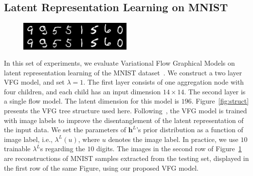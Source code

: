 \documentclass{article}
\begin{document}
\subsection{Latent Representation Learning on MNIST}\label{sec:exp:mnist}
\begin{figure}
\vspace{-0.2in}
    \centering
       \includegraphics[width=0.5\textwidth]{fig/reconst_Y.png}
    \label{fig:reconst}
\vspace{-0.12in}
\end{figure}
In this set of experiments, we evaluate  Variational Flow Graphical Models on latent representation learning of the MNIST dataset~\cite{Lecunmnist2010}. 
We construct a two layer VFG model,  and set $\lambda=1$. 
The first layer consists of one aggregation node with four children, and each child has an input dimension $14\times 14$. 
The second layer is a single flow model.
The latent dimension for this model is $196$. Figure~\ref{fig:struct} presents the VFG tree structure used here.
Following~\cite{Sorrenson2020}, the VFG model is trained with image labels to improve the disentanglement of the latent representation of the input data. 
We set the parameters of $\mathbf{h}^L$'s prior distribution as a function of image label, i.e., $\lambda^L(u)$, where $u$ denotes the image label. In practice, we use $10$ trainable $\lambda^L$s regarding the $10$ digits. 
The images in the second row of Figure~\ref{fig:reconst} are reconstructions of MNIST samples extracted from the testing set, displayed in the first row of the same Figure, using our proposed VFG model.  
\end{document}
